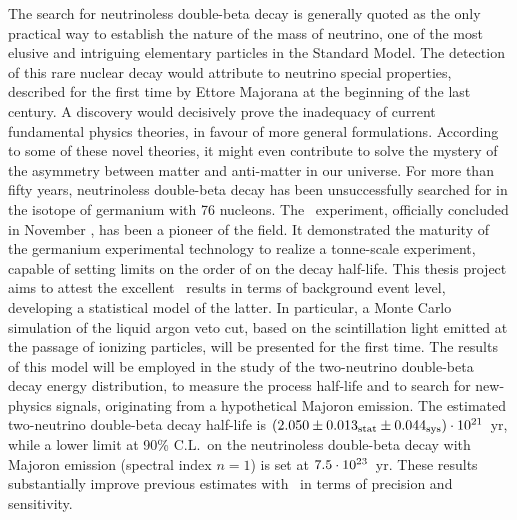 
The search for neutrinoless double-beta decay is generally quoted as the only practical
way to establish the nature of the mass of neutrino, one of the most elusive and intriguing
elementary particles in the Standard Model. The detection of this rare nuclear decay would
attribute to neutrino special properties, described for the first time by Ettore Majorana
at the beginning of the last century. A discovery would decisively prove the inadequacy of
current fundamental physics theories, in favour of more general formulations. According to
some of these novel theories, it might even contribute to solve the mystery of the
asymmetry between matter and anti-matter in our universe. For more than fifty years,
neutrinoless double-beta decay has been unsuccessfully searched for in the isotope of
germanium with 76 nucleons.  The \gerda\ experiment, officially concluded in November
, has been a pioneer of the field. It demonstrated the maturity of the germanium
experimental technology to realize a tonne-scale experiment, capable of setting limits on
the order of  on the decay half-life. This thesis project aims to attest the
excellent \gerda\ results in terms of background event level, developing a statistical
model of the latter. In particular, a Monte Carlo simulation of the liquid argon veto cut,
based on the scintillation light emitted at the passage of ionizing particles, will be
presented for the first time. The results of this model will be employed in the study of
the two-neutrino double-beta decay energy distribution, to measure the process half-life
and to search for new-physics signals, originating from a hypothetical Majoron emission.
The estimated two-neutrino double-beta decay half-life is $(2.050 \pm {0.013}_\text{stat} \pm {0.044}_\text{sys}) \cdot 10^{21}$~yr, while a
lower limit at 90\% C.L.~on the neutrinoless double-beta decay with Majoron emission
(spectral index $n=1$) is set at $7.5 \cdot 10^{23}$~yr.  These results substantially
improve previous estimates with \gesix\ in terms of precision and sensitivity.

